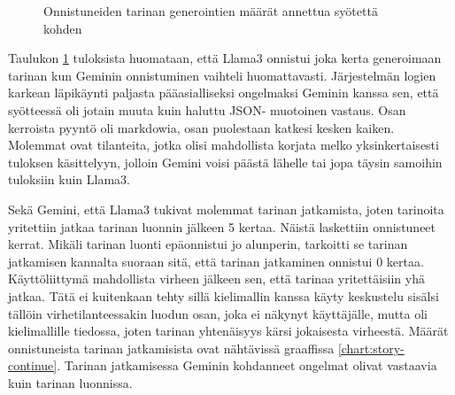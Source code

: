 \begin{figure}[H]
    \centering
    \caption{Onnistuneiden tarinan generointien määrät annettua syötettä kohden}
    \label{chart:story-start}
\end{figure}

Taulukon \ref{chart:story-start} tuloksista huomataan, että Llama3 onnistui
joka kerta generoimaan tarinan kun Geminin onnistuminen vaihteli huomattavasti.
Järjestelmän logien karkean läpikäynti paljasta pääasialliseksi ongelmaksi
Geminin kanssa sen, että syötteessä oli jotain muuta kuin haluttu JSON-
muotoinen vastaus. Osan kerroista pyyntö oli markdowia, osan puolestaan katkesi
kesken kaiken. Molemmat ovat tilanteita, jotka olisi mahdollista korjata melko
yksinkertaisesti tuloksen käsittelyyn, jolloin Gemini voisi päästä lähelle tai
jopa täysin samoihin tuloksiin kuin Llama3.

Sekä Gemini, että Llama3 tukivat molemmat tarinan jatkamista, joten tarinoita
yritettiin jatkaa tarinan luonnin jälkeen 5 kertaa. Näistä laskettiin
onnistuneet kerrat. Mikäli tarinan luonti epäonnistui jo alunperin, tarkoitti
se tarinan jatkamisen kannalta suoraan sitä, että tarinan jatkaminen onnistui
0 kertaa. Käyttöliittymä mahdollista virheen jälkeen sen, että tarinaa
yritettäisiin yhä jatkaa. Tätä ei kuitenkaan tehty sillä kielimallin kanssa
käyty keskustelu sisälsi tällöin virhetilanteessakin luodun osan, joka ei
näkynyt käyttäjälle, mutta oli kielimallille tiedossa, joten tarinan
yhtenäisyys kärsi jokaisesta virheestä. Määrät onnistuneista tarinan
jatkamisista ovat nähtävissä graaffissa \ref{chart:story-continue}. Tarinan
jatkamisessa Geminin kohdanneet ongelmat olivat vastaavia kuin tarinan
luonnissa.

